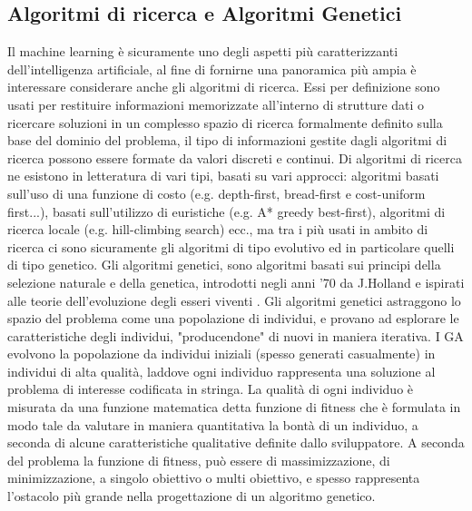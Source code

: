 \subsection{Algoritmi di ricerca e Algoritmi Genetici}
Il machine learning è sicuramente uno degli aspetti più caratterizzanti dell'intelligenza artificiale, al fine di fornirne una panoramica più ampia è interessare considerare anche gli algoritmi di ricerca. Essi per definizione sono usati per restituire informazioni memorizzate all'interno di strutture dati o ricercare soluzioni in un complesso spazio di ricerca formalmente definito sulla base del dominio del problema, il tipo di informazioni gestite dagli algoritmi di ricerca possono essere formate da valori discreti e continui. Di algoritmi di ricerca ne esistono in letteratura di vari tipi, basati su vari approcci: algoritmi basati sull'uso di una funzione di costo (e.g. depth-first, bread-first e cost-uniform first...), basati sull'utilizzo di euristiche (e.g. A* greedy best-first), algoritmi di ricerca locale (e.g. hill-climbing search) ecc., ma tra i più usati in ambito di ricerca ci sono sicuramente gli algoritmi di tipo evolutivo ed in particolare quelli di tipo genetico. Gli algoritmi genetici, sono algoritmi basati sui principi della selezione naturale e della genetica, introdotti negli anni '70  da J.Holland e ispirati alle teorie dell'evoluzione degli esseri viventi \cite{geneticalgotihm}. Gli algoritmi genetici astraggono lo spazio del problema come una popolazione di individui, e provano ad esplorare le caratteristiche degli individui, "producendone" di nuovi in maniera iterativa. I GA evolvono la popolazione da individui iniziali (spesso generati casualmente) in individui di alta qualità, laddove ogni individuo rappresenta una soluzione al problema di interesse codificata in stringa. La qualità di ogni individuo è misurata da una funzione matematica detta funzione di fitness che è formulata in modo tale da valutare in maniera quantitativa la bontà di un individuo, a seconda di alcune caratteristiche qualitative definite dallo sviluppatore. A seconda del problema la funzione di fitness, può essere di massimizzazione, di minimizzazione, a singolo obiettivo o multi obiettivo, e spesso rappresenta l'ostacolo più grande nella progettazione di un algoritmo genetico. \\

